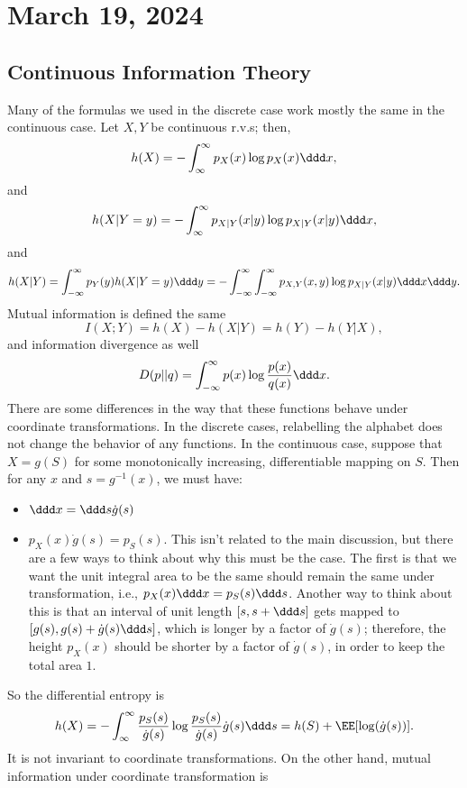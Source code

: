 \section{March 19, 2024}

\subsection{Continuous Information Theory}

Many of the formulas we used in the discrete case work mostly the same in the continuous case. Let $X,Y$ be continuous r.v.s; then, 
\[h(X) = -\int_{\infty}^{\infty} p_X(x) \log p_X(x)\ddd x,\] 
and 
\[h(X|Y=y) = -\int_{\infty}^{\infty}p_{X|Y}(x|y)\log p_{X|Y}(x|y)\ddd x,\]
and 
\[h(X|Y) = \int_{-\infty}^{\infty}p_Y(y)h(X|Y=y)\ddd y = -\int_{-\infty}^{\infty}\int_{-\infty}^{\infty} p_{X,Y}(x,y)\log p_{X|Y}(x|y)\ddd x \ddd y.\] 
Mutual information is defined the same
\[I(X;Y) = h(X) - h(X|Y) = h(Y) - h(Y|X),\]
and information divergence as well
\[D(p||q) = \int_{-\infty}^{\infty}p(x) \log \frac{p(x)}{q(x)}\ddd x.\] 
There are some differences in the way that these functions behave under coordinate transformations. In the discrete cases, relabelling the alphabet does not change the behavior of any functions. In the continuous case, suppose that $X = g(S)$ for some monotonically increasing, differentiable mapping on $S$. Then for any $x$ and $s = g^{-1}(x)$, we must have:
\begin{itemize}
	\item $\ddd x = \ddd s \dot{g}(s)$
	\item $p_X(x)\dot{g}(s) = p_S(s)$. This isn't related to the main discussion, but there are a few ways to think about why this must be the case. The first is that we want the unit integral area to be the same should remain the same under transformation, i.e., $p_X(x) \ddd x = p_S(s) \ddd s$. Another way to think about this is that an interval of unit length $[s, s+\ddd s]$ gets mapped to $[g(s), g(s)+\dot{g}(s)\ddd s]$, which is longer by a factor of $\dot{g}(s)$; therefore, the height $p_X(x)$ should be shorter by a factor of $\dot{g}(s)$, in order to keep the total area $1$. 
\end{itemize}
So the differential entropy is
\begin{align*}
	h(X) = -\int_{\infty}^{\infty}\frac{p_S(s)}{\dot{g}(s)}\log \frac{p_S(s)}{\dot{g}(s)} \dot{g}(s)\ddd s = h(S) + \EE[\log(\dot{g}(s))].
\end{align*}
It is not invariant to coordinate transformations. On the other hand, mutual information under coordinate transformation is 
